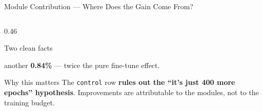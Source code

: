 \documentclass[aspectratio=169,11pt]{beamer}
\begin{document}
\begin{frame}{Module Contribution --- Where Does the Gain Come From?}
\begin{columns}[T,totalwidth=\textwidth]
\begin{column}{0.46\textwidth}
\begin{block}{Two clean facts}
\begin{itemize}
                another \textbf{0.84\%}
                --- twice the pure fine-tune effect.
        \end{itemize}
      \end{block}
      \begin{alertblock}{Why this matters}
        The \texttt{control} row \textbf{rules out the
        ``it's just 400 more epochs'' hypothesis}.
        Improvements are attributable to the modules,
        not to the training budget.
      \end{alertblock}
    \end{column}
  \end{columns}
\end{frame}

\end{document}
